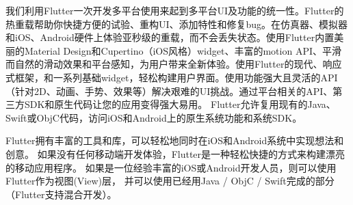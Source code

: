 我们利用Flutter一次开发多平台使用来起到多平台UI及功能的统一性。Flutter的热重载帮助你快捷方便的试验、重构UI、添加特性和修复bug。在仿真器、模拟器和iOS、Android硬件上体验亚秒级的重载，而不会丢失状态。使用Flutter内置美丽的Material Design和Cupertino（iOS风格）widget、丰富的motion API、平滑而自然的滑动效果和平台感知，为用户带来全新体验。使用Flutter的现代、响应式框架，和一系列基础widget，轻松构建用户界面。使用功能强大且灵活的API（针对2D、动画、手势、效果等）解决艰难的UI挑战。通过平台相关的API、第三方SDK和原生代码让您的应用变得强大易用。 Flutter允许复用现有的Java、Swift或ObjC代码，访问iOS和Android上的原生系统功能和系统SDK。

Flutter拥有丰富的工具和库，可以轻松地同时在iOS和Android系统中实现想法和创意。 如果没有任何移动端开发体验，Flutter是一种轻松快捷的方式来构建漂亮的移动应用程序。 如果是一位经验丰富的iOS或Android开发人员，则可以使用Flutter作为视图(View)层， 并可以使用已经用Java / ObjC / Swift完成的部分（Flutter支持混合开发）。